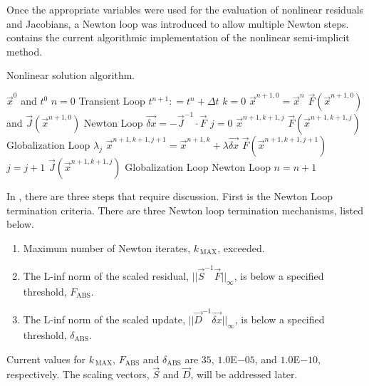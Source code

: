 Once the appropriate variables were used for the evaluation of nonlinear residuals and Jacobians, a Newton loop was introduced to allow multiple Newton steps.
 contains the current algorithmic implementation of the nonlinear semi-implicit method.

\begin{algo}[H]
\caption{Nonlinear \cobra{} solution algorithm.}
\label{alg:nl_cobra}
\setlength{\baselineskip}{0.625\baselineskip}
\begin{algorithmic}[1]
\Require $\vec{x}^{0}$ and $t^{0}$
\Set $n = 0$
\Loop \; Transient Loop
    \State $t^{n+1} : = t^{n} + \Delta t$
    \State $k = 0$
    \Define $\vec{x}^{n+1,0} = \vec{x}^{n}$
	\Calculate $\vec{F}(\vec{x}^{n+1,0})$ and $\vec{J}(\vec{x}^{n+1,0})$
    \Loop \; Newton Loop
		\Calculate $\vec{\delta x} = - \vec{J}^{-1}\cdot\vec{F}$
		$j = 0$		
		\Calculate $\vec{x}^{n+1,k+1,j}$
		\Calculate $\vec{F}(\vec{x}^{n+1,k+1,j})$
		\Loop \; Globalization Loop
				\Calculate $\lambda_j$
				\Calculate $\vec{x}^{n+1,k+1,j+1} = \vec{x}^{n+1,k} + \lambda \vec{\delta x}$
				\Calculate $\vec{F}(\vec{x}^{n+1,k+1,j+1})$
				\State $j = j + 1$			
			\Else
				\Calculate $\vec{J}(\vec{x}^{n+1,k+1,j})$
				\Exit Globalization Loop
			\EndIf
		\EndLoop			
			\Exit Newton Loop
		\EndIf
	\EndLoop
	\State $n = n + 1$
\EndLoop
\end{algorithmic}
\end{algo}

In , there are three steps that require discussion.
First is the Newton Loop termination criteria.
There are three Newton loop termination mechanisms, listed below.

\begin{enumerate}
\item{Maximum number of Newton iterates, $k_{\,\text{MAX}}$, exceeded.}
\item{The L-inf norm of the scaled residual, $||\vec{S}^{-1}\vec{F}||_{\infty}$, is below a specified threshold, $F_{\text{ABS}}$.}
\item{The L-inf norm of the scaled update, $||\vec{D}^{-1}\vec{\delta x}||_{\infty}$, is below a specified threshold, $\delta_{\text{ABS}}$.}
\end{enumerate}

Current values for $k_{\,\text{MAX}}$, $F_{\text{ABS}}$ and $\delta_{\text{ABS}}$ are $35$, $1.0$E$-05$, and $1.0$E$-10$, respectively.
The scaling vectors, $\vec{S}$ and $\vec{D}$, will be addressed later.

